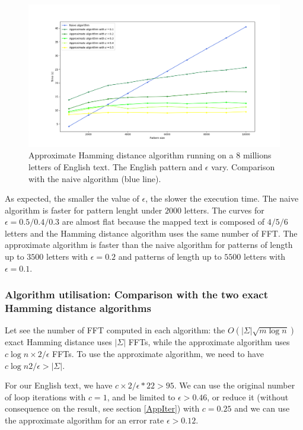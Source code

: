 \documentclass[preprint,12pt]{elsarticle}
\begin{document}
\begin{figure}[h]
\includegraphics[scale=0.45]{./figures/appHDTempsError.png}
\caption{Approximate Hamming distance algorithm running on a $8$ millions letters of English text.
The English pattern and $\epsilon$ vary.
Comparison with the naive algorithm (blue line).}
\label{AppHDTempsErr}
\end{figure}

As expected, the smaller the value of $\epsilon$, the slower the execution time.
The naive algorithm is faster for pattern lenght under $2000$ letters.
The curves for $\epsilon = 0.5 / 0.4 / 0.3$ are almost flat
because the mapped text is composed of $4 / 5 / 6$ letters
and the Hamming distance algorithm uses the same number of FFT.
The approximate algorithm is faster than the naive algorithm
for patterns of length up to $3500$ letters with $\epsilon = 0.2$
and patterns of length up to $5500$ letters with $\epsilon = 0.1$.



\subsubsection*{Algorithm utilisation: Comparison with the two exact Hamming distance algorithms}


Let see the number of FFT computed in each algorithm:
the $O(|\Sigma| \sqrt{m \log n})$ exact Hamming distance uses $|\Sigma|$ FFTs,
while the approximate algorithm uses $c \log n \times 2/\epsilon$ FFTs.
To use the approximate algorithm, we need to have $c \log n 2/\epsilon > |\Sigma|$. 

For our English text, we have $c \times 2/\epsilon * 22 > 95$.
We can use the original number of loop iterations with $c = 1$,
and be limited to $\epsilon > 0.46$,
or reduce it (without consequence on the result, see section \ref{AppIter})
with $c = 0.25$ and we can use the approximate algorithm for an error rate $\epsilon > 0.12$.
\end{document}
